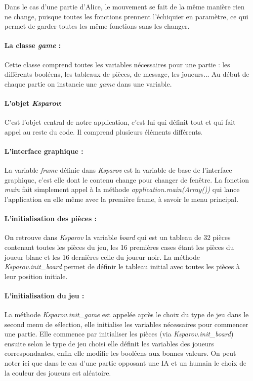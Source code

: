 \documentclass[a4paper]{article}
\begin{document}
Dans le cas d'une partie d'Alice, le mouvement se fait de la même manière rien ne change, puisque toutes les fonctions prennent l'échiquier en paramètre, ce qui permet de garder toutes les même fonctions sans les changer. 

\paragraph{La classe \textit{game} :}Cette classe comprend toutes les variables nécessaires pour une partie : les différents booléens, les tableaux de pièces, de message, les joueurs... Au début de chaque partie on instancie une \textit{game} dans une variable. 

\paragraph{L'objet \textit{Ksparov}:}C'est l'objet central de notre application, c'est lui qui définit tout et qui fait appel au reste du code. Il comprend plusieurs éléments différents. 

\paragraph{L'interface graphique :}La variable \textit{frame} définie dans \textit{Ksparov} est la variable de base de l'interface graphique, c'est elle dont le contenu change pour changer de fenêtre. La fonction \textit{main} fait simplement appel à la méthode \textit{application.main(Array())} qui lance l'application en elle même avec la première frame, à savoir le menu principal. 

\paragraph{L'initialisation des pièces :}On retrouve dans \textit{Ksparov} la variable \textit{board} qui est un tableau de 32 pièces contenant toutes les pièces du jeu, les 16 premières cases étant les pièces du joueur blanc et les 16 dernières celle du joueur noir. La méthode \textit{Ksparov.init\_board} permet de définir le tableau initial avec toutes les pièces à leur position initiale.

\paragraph{L'initialisation du jeu :}La méthode \textit{Ksparov.init\_game} est appelée après le choix du type de jeu dans le second menu de sélection, elle initialise les variables nécessaires pour commencer une partie. Elle commence par initialiser les pièces (via \textit{Ksparov.init\_board}) ensuite selon le type de jeu choisi elle définit les variables des joueurs correspondantes, enfin elle modifie les booléens aux bonnes valeurs. On peut noter ici que dans le cas d'une partie opposant une IA et un humain le choix de la couleur des joueurs est aléatoire. 
\end{document}
